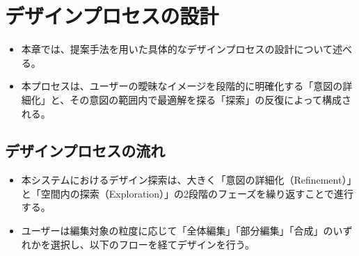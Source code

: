 \documentclass[dvipdfmx]{jlreq}
\begin{document}
\section{デザインプロセスの設計}
\begin{itemize}
  \item 本章では、提案手法を用いた具体的なデザインプロセスの設計について述べる。
  \item 本プロセスは、ユーザーの曖昧なイメージを段階的に明確化する「意図の詳細化」と、その意図の範囲内で最適解を探る「探索」の反復によって構成される。
\end{itemize}

\subsection{デザインプロセスの流れ}
\begin{itemize}
  \item 本システムにおけるデザイン探索は、大きく「意図の詳細化（Refinement）」と「空間内の探索（Exploration）」の2段階のフェーズを繰り返すことで進行する。
  \item ユーザーは編集対象の粒度に応じて「全体編集」「部分編集」「合成」のいずれかを選択し、以下のフローを経てデザインを行う。

\end{itemize}
\end{document}
